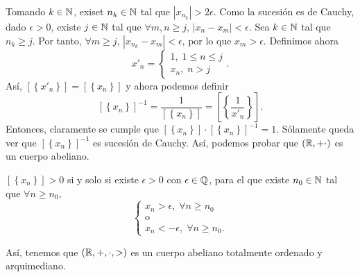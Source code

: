 Tomando $\displaystyle k \in \mathbb{N} $, exiset $\displaystyle n_{k} \in \mathbb{N} $ tal que $\displaystyle \left|x_{n_{k}}\right| > 2\epsilon  $. Como la sucesión es de Cauchy, dado $\displaystyle \epsilon > 0 $, existe $\displaystyle j \in \mathbb{N} $ tal que $\displaystyle \forall m,n \geq j $, $\displaystyle \left|x_{n}-x_{m}\right| < \epsilon  $. Sea $\displaystyle k \in \mathbb{N} $ tal que $\displaystyle n_{k} \geq j $. Por tanto, $\displaystyle \forall m \geq j $, $\displaystyle \left|x_{n_{k}}-x_{m}\right| < \epsilon  $, por lo que $\displaystyle x_{m} > \epsilon  $. Definimos ahora
\[x'_{n} = 
\begin{cases}
1, \; 1 \leq n \leq j \\
x_{n}, \; n > j
\end{cases}
.\]
Así, $\displaystyle [ \left\{ x'_{n}\right\}] = [ \left\{ x_{n}\right\}]  $ y ahora podemos definir
\[[ \left\{ x_{n}\right\}] ^{-1} = \frac{1}{[ \left\{ x_{n}\right\}] } = \left[ \left\{ \frac{1}{x'_{n}}\right\}\right]  .\]
Entonces, claramente se cumple que $\displaystyle [ \left\{ x_{n}\right\}] \cdot [ \left\{ x_{n}\right\}] ^{-1} = 1 $. Sólamente queda ver que $\displaystyle [ \left\{ x_{n}\right\}] ^{-1} $ es sucesión de Cauchy.
Así, podemos probar que $\displaystyle \left(\mathbb{R}, + \cdot\right) $ es un cuerpo abeliano.

\begin{fdefinition}[]
\normalfont $\displaystyle [ \left\{ x_{n}\right\}] > 0 $ si y solo si existe $\displaystyle \epsilon > 0 $ con $\displaystyle \epsilon \in \mathbb{Q} $, para el que existe $\displaystyle n_{0} \in \mathbb{N} $ tal que $\displaystyle \forall n \geq n_{0} $, 
\[
\begin{cases}
x_{n} > \epsilon, \; \forall n\geq n_{0} \\
\text{o} \\
x_{n} < -\epsilon, \; \forall n\geq n_{0}.
\end{cases}
\]
\end{fdefinition}

Así, tenemos que $\displaystyle \left(\mathbb{R}, + , \cdot, >\right) $ es un cuerpo abeliano totalmente ordenado y arquimediano. 
